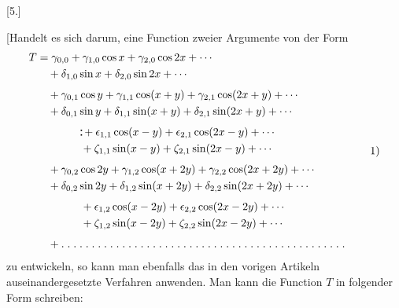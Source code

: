 \clearpage
\begin{landscape}
\begingroup
\fontsize{10}{13}\selectfont
{}
\renewcommand{\headrulewidth}{0pt}
\setlength{\lineskip}{4pt}\setlength{\lineskiplimit}{4pt}
\setlength{\arraycolsep}{4pt}
\makeatletter\tagsleft@true\makeatother
\newcommand{\VFivePair}{\mathord{\vcenter{\offinterlineskip\hbox{\rule{.12em}{.12em}}\kern.30em\hbox{\rule{.12em}{.12em}}}}}
\newcommand{\VFivePoint}{\mathord{.}\mkern5mu}
\newcommand{\VFiveTenPoints}{\VFivePoint\VFivePoint\VFivePoint\VFivePoint\VFivePoint\VFivePoint\VFivePoint\VFivePoint\VFivePoint\VFivePoint}
\begin{center}[5.]\end{center}
\par\noindent\hspace*{\parindent}[Handelt es sich darum, eine Function zweier Argumente von der Form
\[
\begin{aligned}
T&=\gamma_{0,0}+\gamma_{1,0}\cos x+\gamma_{2,0}\cos2x+\cdots\\
 &\quad+\delta_{1,0}\sin x+\delta_{2,0}\sin2x+\cdots\\[4pt]
 &\quad+\gamma_{0,1}\cos y+\gamma_{1,1}\cos(x+y)+\gamma_{2,1}\cos(2x+y)+\cdots\\
 &\quad+\delta_{0,1}\sin y+\delta_{1,1}\sin(x+y)+\delta_{2,1}\sin(2x+y)+\cdots\\[4pt]
 &\qquad\qquad\VFivePair+\epsilon_{1,1}\cos(x-y)+\epsilon_{2,1}\cos(2x-y)+\cdots\\
 &\qquad\qquad+\zeta_{1,1}\sin(x-y)+\zeta_{2,1}\sin(2x-y)+\cdots\\[4pt]
 &\quad+\gamma_{0,2}\cos2y+\gamma_{1,2}\cos(x+2y)+\gamma_{2,2}\cos(2x+2y)+\cdots\\
 &\quad+\delta_{0,2}\sin2y+\delta_{1,2}\sin(x+2y)+\delta_{2,2}\sin(2x+2y)+\cdots\\[4pt]
 &\qquad\qquad+\epsilon_{1,2}\cos(x-2y)+\epsilon_{2,2}\cos(2x-2y)+\cdots\\
 &\qquad\qquad+\zeta_{1,2}\sin(x-2y)+\zeta_{2,2}\sin(2x-2y)+\cdots\\[4pt]
 &\quad+\VFiveTenPoints\VFiveTenPoints\VFiveTenPoints\VFiveTenPoints\VFivePoint\VFivePoint\VFivePoint\VFivePoint\VFivePoint\VFivePoint\VFivePoint
\end{aligned}\tag*{1)}
\]
zu entwickeln, so kann man ebenfalls das in den vorigen Artikeln auseinandergesetzte Verfahren anwenden. Man kann die Function \(T\) in folgender Form schreiben:

\end{landscape}
